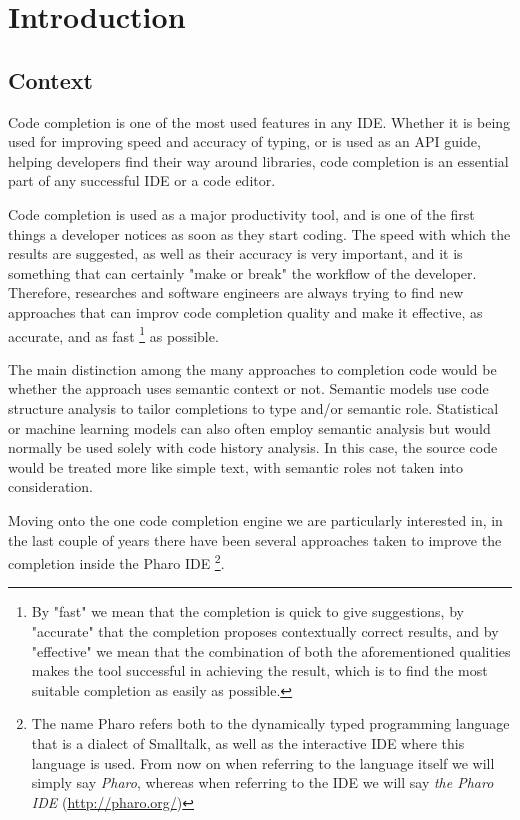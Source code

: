 \chapter{Introduction}
\label{chap:Introduction}

\section{Context}
Code completion is one of the most used features in any IDE. Whether it is being used for improving speed and accuracy of typing, or is used as an API guide, helping developers find their way around libraries, code completion is an essential part of any successful IDE or a code editor.

Code completion is used as a major productivity tool, and is one of the first things a developer notices as soon as they start coding. The speed with which the results are suggested, as well as their accuracy is very important, and it is something that can certainly "make or break" the workflow of the developer. Therefore, researches and software engineers are always trying to find new approaches that can improv code completion quality and make it effective, as accurate, and as fast \footnote{By "fast" we mean that the completion is quick to give suggestions, by "accurate" that the completion proposes contextually correct results, and by "effective" we mean that the combination of both the aforementioned qualities makes the tool successful in achieving the result, which is to find the most suitable completion as easily as possible.} as possible.

The main distinction among the many approaches to completion code would be whether the approach uses semantic context or not. Semantic models use code structure analysis to tailor completions to type and/or semantic role. Statistical or machine learning models can also often employ semantic analysis but would normally be used solely with code history analysis. In this case, the source code would be treated more like simple text, with semantic roles not taken into consideration.

Moving onto the one code completion engine we are particularly interested in, in the last couple of years there have been several approaches taken to improve the completion inside the Pharo IDE \footnote{The name Pharo refers both to the dynamically typed programming language that is a dialect of Smalltalk, as well as the interactive IDE where this language is used. \newline From now on when referring to the language itself we will simply say \textit{Pharo}, whereas when referring to the IDE we will say \textit{the Pharo IDE} (\url{http://pharo.org/})}.


